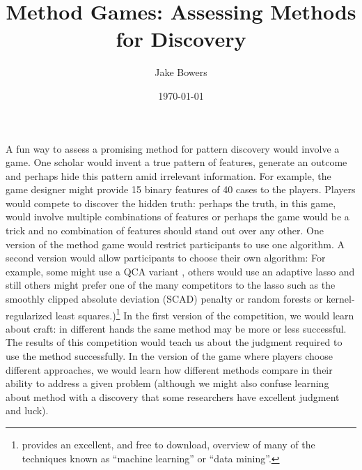 \documentclass[12pt]{article}
\title{Method Games: Assessing Methods for Discovery}
\author{Jake Bowers}
\date{\today}
\begin{document}
\maketitle

A fun way to assess a promising method for pattern discovery would involve a
game.  One scholar would invent a true pattern of features, generate an
outcome and perhaps hide this pattern amid irrelevant information.  For
example, the game designer might provide 15 binary features of 40 cases to the
players. Players would compete to discover the hidden truth: perhaps the
truth, in this game, would involve multiple combinations of features or
perhaps the game would be a trick and no combination of features should stand
out over any other.  One version of the method game would restrict
participants to use one algorithm. A second version would allow participants
to choose their own algorithm: For example, some might use a QCA variant
\citep{rihoux2008configurational}, others would use an adaptive lasso
\citep{zou2006adaptive} and still others might prefer one of the many
competitors to the lasso such as the smoothly clipped absolute deviation
(SCAD) penalty \citep{fan2001variable} or random forests
\citep{breiman2001random} or kernel-regularized least
squares\citep{}.)\footnote{ \citet{hasttibfried09} provides an
  excellent, and free to download, overview of many of the techniques known as
  ``machine learning'' or ``data mining''.} In the first version of the
competition, we would learn about craft: in different hands the same method
may be more or less successful. The results of this competition would teach us
about the judgment required to use the method successfully.  In the version of
the game where players choose different approaches, we would learn how different methods
compare in their ability to address a given problem (although we might also
confuse learning about method with a discovery that some researchers have
excellent judgment and luck).
\end{document}
